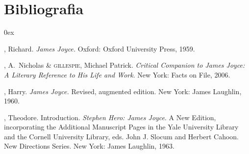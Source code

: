 \section*{Bibliografia}

\begin{description}0ex
\newcommand{\tit}[1]{\item[\textnormal{\textsc{\MakeTextLowercase{#1}}}]}
\newcommand{\titidem}{\item[\line(1,0){25}]}

\tit{ELLMANN}, Richard.  \textit{James Joyce.}  Oxford: Oxford University
Press, 1959.

\tit{Fargnoli}, A.~Nicholas \& \textsc{gillespie}, Michael Patrick. 
\textit{Critical Companion to James Joyce: A Literary Reference to His Life and Work}.
New York: Facts on File, 2006.

\tit{LEVIN}, Harry.  \textit{James Joyce.}  Revised, augmented edition.  New
York: James Laughlin, 1960.

\tit{SPENCER}, Theodore.  Introduction.  \textit{Stephen Hero: James Joyce}. 
A New Edition, incorporating the Additional Manuscript Pages in the Yale
University Library and the Cornell University Library, eds. John J.
Slocum and Herbert Cahoon.  New Directions Series.  New York: James
Laughlin, 1963.

\end{description}

